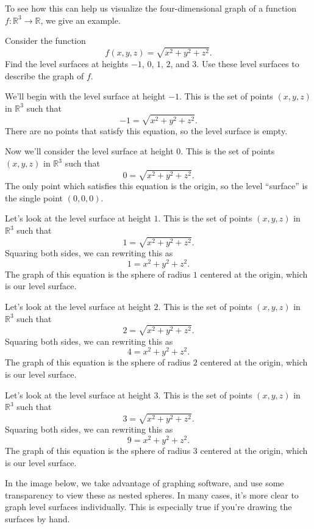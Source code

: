 \documentclass{ximera}
\begin{document}
To see how this can help us visualize the four-dimensional graph of a function $f:\mathbb{R}^3\rightarrow\mathbb{R}$, we give an example.

\begin{example}
Consider the function
\[
f(x,y,z) = \sqrt{x^2 + y^2 + z^2}.
\]
Find the level surfaces at heights $-1$, $0$, $1$, $2$, and $3$. Use these level surfaces to describe the graph of $f$.

We'll begin with the level surface at height $-1$. This is the set of points $(x,y,z)$ in $\mathbb{R}^3$ such that
\[
-1 = \sqrt{x^2+y^2+z^2}.
\]
There are no points that satisfy this equation, so the level surface is empty.

Now we'll consider the level surface at height $0$. This is the set of points $(x,y,z)$ in $\mathbb{R}^3$ such that
\[
0 = \sqrt{x^2+y^2+z^2}.
\]
The only point which satisfies this equation is the origin, so the level ``surface'' is the single point $(0,0,0)$.

Let's look at the level surface at height $1$. This is the set of points $(x,y,z)$ in $\mathbb{R}^3$ such that
\[
1 = \sqrt{x^2+y^2+z^2}.
\]
Squaring both sides, we can rewriting this as 
\[
1 = x^2+y^2+z^2.
\]
The graph of this equation is the sphere of radius $1$ centered at the origin, which is our level surface.

Let's look at the level surface at height $2$. This is the set of points $(x,y,z)$ in $\mathbb{R}^3$ such that
\[
2 = \sqrt{x^2+y^2+z^2}.
\]
Squaring both sides, we can rewriting this as 
\[
4 = x^2+y^2+z^2.
\]
The graph of this equation is the sphere of radius $2$ centered at the origin, which is our level surface.

Let's look at the level surface at height $3$. This is the set of points $(x,y,z)$ in $\mathbb{R}^3$ such that
\[
3 = \sqrt{x^2+y^2+z^2}.
\]
Squaring both sides, we can rewriting this as 
\[
9 = x^2+y^2+z^2.
\]
The graph of this equation is the sphere of radius $3$ centered at the origin, which is our level surface.

In the image below, we take advantage of graphing software, and use some transparency to view these as nested spheres. In many cases, it's more clear to graph level surfaces individually. This is especially true if you're drawing the surfaces by hand.


\end{example}
\end{document}
